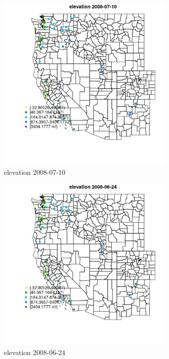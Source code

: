 \begin{figure} 
\centering  
\includegraphics[width=0.77\textwidth]{Code_Outputs/Report_ML_input_PM25_Step4_part_e_de_duplicated_aves_MapObselevation2008-07-10.jpg} 
\caption{\label{fig:Report_ML_input_PM25_Step4_part_e_de_duplicated_avesMapObselevation2008-07-10}elevation 2008-07-10} 
\end{figure} 
 

\begin{figure} 
\centering  
\includegraphics[width=0.77\textwidth]{Code_Outputs/Report_ML_input_PM25_Step4_part_e_de_duplicated_aves_MapObselevation2008-06-24.jpg} 
\caption{\label{fig:Report_ML_input_PM25_Step4_part_e_de_duplicated_avesMapObselevation2008-06-24}elevation 2008-06-24} 
\end{figure} 
 

